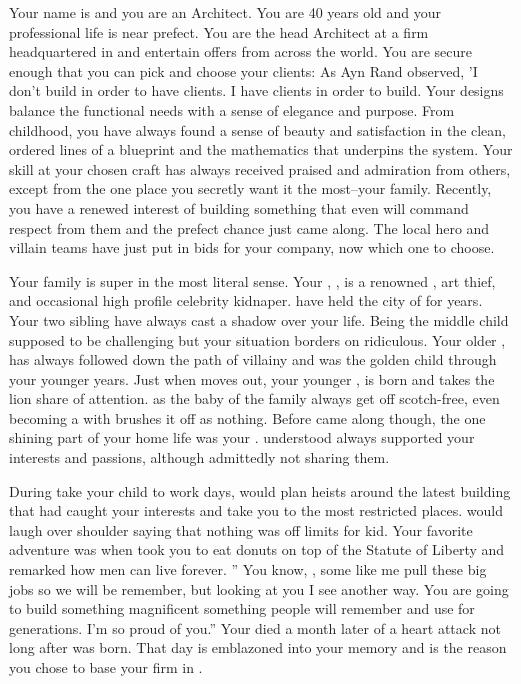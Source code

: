 \documentclass[char]{LRSguildcamp1}
\begin{document}
\name{\cArchitect{}}


Your name is \cArchitect{\intro} and you are an Architect. You are 40 years old and your professional life is near prefect. You are the head Architect at a firm headquartered in \pCityArchitect{} and entertain offers from across the world.  You are secure enough that you can pick and choose your clients: As Ayn Rand observed, 'I don't build in order to have clients. I have clients in order to build. Your designs balance the functional needs with a sense of elegance and purpose. From childhood, you have always found a sense of beauty and satisfaction in the clean, ordered lines of a blueprint and the mathematics that underpins the system. Your skill at your chosen craft has always received praised and admiration from others, except from the one place you secretly want it the most--your family. Recently, you have a renewed interest of building something that even will command respect from them and the prefect chance just came along. The local hero and villain teams have just put in bids for your company, now which one to choose.

Your family is super in the most literal sense. Your \cGrandma{\parent}, \cGrandma{}, is a renowned \cGrandma{\villain}, art thief, and occasional high profile celebrity kidnaper. \cGrandma{\They} have held the city of \pCityGrandma{} for years. Your two sibling have always cast a shadow over your life. Being the middle child supposed to be challenging but your situation borders on ridiculous. Your older \cOldest{\sibling}, \cOldest{} has always followed \cGrandma{} down the path of villainy and was the golden child through your younger years. Just when \cOldest{} moves out, your younger \cYoungest{\sibling}, \cYoungest{} is born and takes the lion share of attention. \cYoungest{\They} as the baby of the family always get off scotch-free, even becoming a \cYoungest{\hero} with \cGrandma{} brushes it off as nothing. Before \cYoungest{} came along though, the one shining part of your home life was your \cGS{\parent} \cGS{}. \cGS{} understood always supported your interests and passions, although admittedly not sharing them. 

During take your child to work days, \cGS{} would plan \cGS{\their} heists around the latest building that had caught your interests and take you to the most restricted places. \cGS{} would laugh over \cGS{\their} shoulder saying that nothing was off limits for \cGS{\their} kid. Your favorite adventure was when \cGS{\they} took you to eat donuts on top of the Statute of Liberty and remarked how men can live forever.  '' You know, \cArchitect{}, some \cGS{\humans} like me pull these big jobs so we will be remember, but looking at you I see another way. You are going to build something magnificent something people will remember and use for generations. I'm so proud of you.'' Your \cGS{\parent} died a month later of a heart attack not long after \cYoungest{} was born. That day is emblazoned into your memory and is the reason you chose to base your firm in \pCityArchitect{}.
\end{document}
